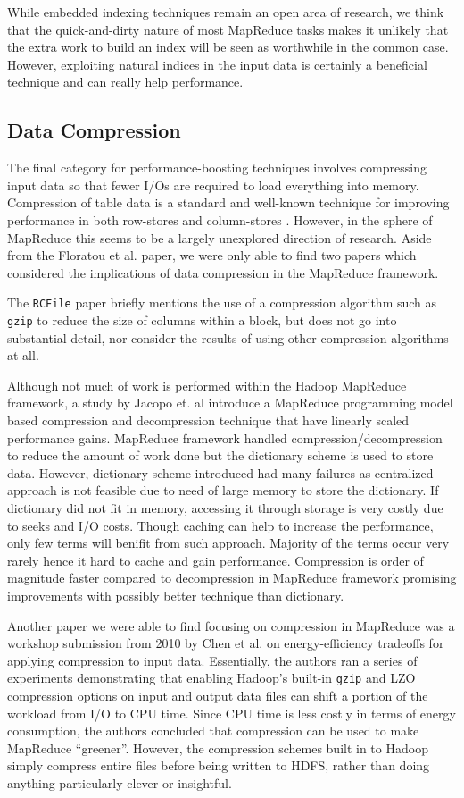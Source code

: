 \documentclass[twocolumn]{article}
\begin{document}
While embedded indexing techniques remain an open area of research, we think
that the quick-and-dirty nature of most MapReduce tasks makes it
unlikely that the extra work to build an index will be seen as worthwhile
in the common case.  However, exploiting natural indices in the input
data is certainly a beneficial technique and can really help performance.

\subsection{Data Compression}

The final category for performance-boosting techniques involves compressing
input data so that fewer I/Os are required to load everything into memory.
Compression of table data is a standard and well-known technique for
improving performance in both row-stores and column-stores \cite{ref:colstore-comp}.
However, in the sphere of MapReduce this seems to be a largely unexplored
direction of research.  Aside from the Floratou et al. paper, we were
only able to find two papers which considered the implications of data
compression in the MapReduce framework.

The \verb+RCFile+ paper briefly mentions the use of a compression algorithm
such as \verb+gzip+ to reduce the size of columns within a block, but does
not go into substantial detail, nor consider the results of using other
compression algorithms at all.


Although not much of work is performed within the Hadoop MapReduce framework,
a study by Jacopo et. al \cite{web-compression} introduce a MapReduce programming 
model based compression and decompression technique that have linearly scaled 
performance gains. MapReduce framework handled compression/decompression to reduce
the amount of work done but the dictionary scheme is used to store data. However, 
dictionary scheme introduced had many failures as centralized approach is not 
feasible due to need of large memory to store the dictionary. If dictionary did not 
fit in memory, accessing it through storage is very costly due to seeks and I/O costs.
Though caching can help to increase the performance, only few terms will benifit from 
such approach. Majority of the terms occur very rarely hence it hard to cache and 
gain performance. Compression is order of magnitude faster compared to decompression 
in MapReduce framework promising improvements with possibly better technique than
dictionary.

Another paper we were able to find focusing on compression in MapReduce
was a workshop submission from 2010 by Chen et al. \cite{ref:energy} on
energy-efficiency tradeoffs for applying compression to input data.
Essentially, the authors ran a series of experiments demonstrating that
enabling Hadoop's built-in \verb+gzip+ and LZO compression options
on input and output data files can shift a portion of the workload
from I/O to CPU time.  Since CPU time is less costly in terms of energy
consumption, the authors concluded that compression can be used to make
MapReduce ``greener''.  However, the compression schemes built in to 
Hadoop simply compress entire files before being written to HDFS, rather
than doing anything particularly clever or insightful.
\end{document}
